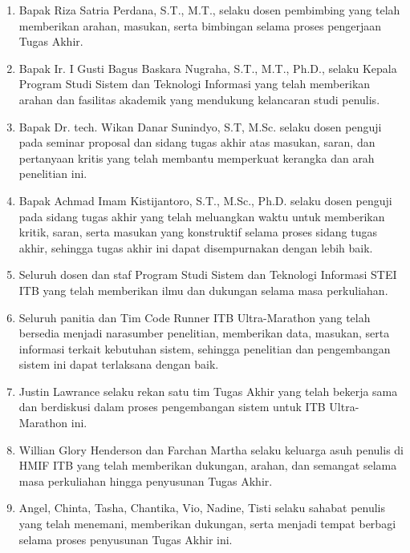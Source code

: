 \begin{enumerate}
    \item Bapak Riza Satria Perdana, S.T., M.T., selaku dosen pembimbing yang telah memberikan arahan, masukan, serta bimbingan selama proses pengerjaan Tugas Akhir.
    
    \item Bapak Ir. I Gusti Bagus Baskara Nugraha, S.T., M.T., Ph.D., selaku Kepala Program Studi Sistem dan Teknologi Informasi yang telah memberikan arahan dan fasilitas akademik yang mendukung kelancaran studi penulis.
    
    \item Bapak Dr. tech. Wikan Danar Sunindyo, S.T, M.Sc. selaku dosen penguji pada seminar proposal dan sidang tugas akhir atas masukan, saran, dan pertanyaan kritis yang telah membantu memperkuat kerangka dan arah penelitian ini.
    
    \item Bapak Achmad Imam Kistijantoro, S.T., M.Sc., Ph.D. selaku dosen penguji pada sidang tugas akhir yang telah meluangkan waktu untuk memberikan kritik, saran, serta masukan yang konstruktif selama proses sidang tugas akhir, sehingga tugas akhir ini dapat disempurnakan dengan lebih baik.

    \item Seluruh dosen dan staf Program Studi Sistem dan Teknologi Informasi STEI ITB yang telah memberikan ilmu dan dukungan selama masa perkuliahan.
    
    \item Seluruh panitia dan Tim Code Runner ITB Ultra-Marathon yang telah bersedia menjadi narasumber penelitian, memberikan data, masukan, serta informasi terkait kebutuhan sistem, sehingga penelitian dan pengembangan sistem ini dapat terlaksana dengan baik.

    \item Justin Lawrance selaku rekan satu tim Tugas Akhir yang telah bekerja sama dan berdiskusi dalam proses pengembangan sistem untuk ITB Ultra-Marathon ini.
    
    \item Willian Glory Henderson dan Farchan Martha selaku keluarga asuh penulis di HMIF ITB yang telah memberikan dukungan, arahan, dan semangat selama masa perkuliahan hingga penyusunan Tugas Akhir.
    
    \item Angel, Chinta, Tasha, Chantika, Vio, Nadine, Tisti selaku sahabat penulis yang telah menemani, memberikan dukungan, serta menjadi tempat berbagi selama proses penyusunan Tugas Akhir ini.
    

\end{enumerate}
